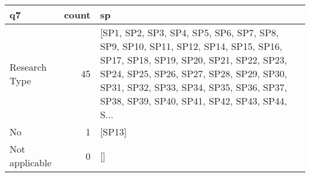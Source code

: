 \begin{tabular}{lrl}
\toprule
             q7 &  count &                                                                                                                                                                                                                                                              sp \\
\midrule
  Research Type &     45 &  [SP1, SP2, SP3, SP4, SP5, SP6, SP7, SP8, SP9, SP10, SP11, SP12, SP14, SP15, SP16, SP17, SP18, SP19, SP20, SP21, SP22, SP23, SP24, SP25, SP26, SP27, SP28, SP29, SP30, SP31, SP32, SP33, SP34, SP35, SP36, SP37, SP38, SP39, SP40, SP41, SP42, SP43, SP44, S... \\
             No &      1 &                                                                                                                                                                                                                                                          [SP13] \\
 Not applicable &      0 &                                                                                                                                                                                                                                                              [] \\
\bottomrule
\end{tabular}
